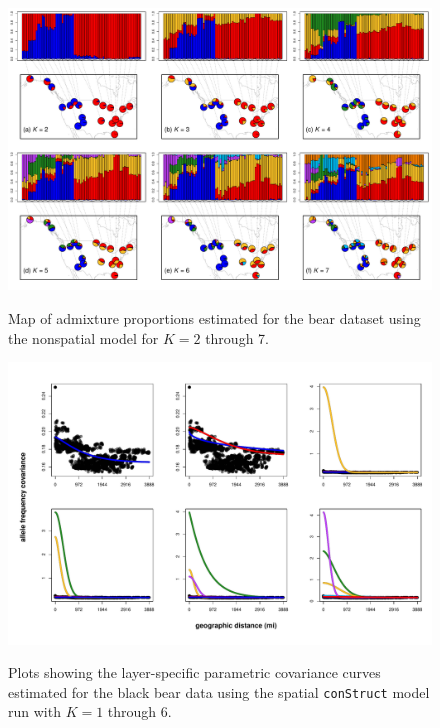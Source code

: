 \documentclass[10pt,letterpaper]{article}
\begin{document}
\begin{figure}
	\centering
		{\includegraphics[width=\textwidth]{figs/bears/bear_nsp_results.pdf}}
	\caption{
	Map of admixture proportions estimated for the bear dataset 
	using the nonspatial model for $K=2$ through 7.
    }\label{bear_nsp_pies}
\end{figure}
\clearpage

\begin{figure}
	\centering
		{\includegraphics[width=\textwidth]{figs/bears/bear_sp_layer_covs.pdf}}
	\caption{
	Plots showing the layer-specific parametric covariance curves 
	estimated for the black bear data using 
	the spatial \texttt{conStruct} model run with $K=1$ through 6.
	 }\label{bear_sp_layer_covs}
\end{figure}
\clearpage
\end{document}
